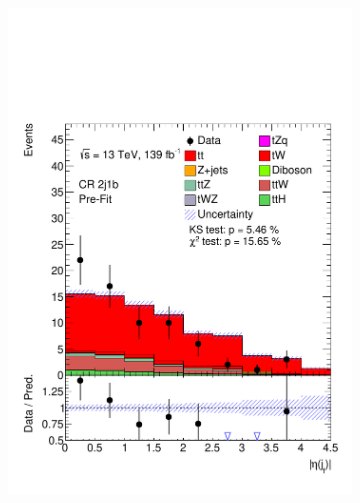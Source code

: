 \begin{figure}[h!]
\begin{subfigure}[b]{0.33\linewidth}
    \includegraphics[width=\linewidth]{ubonn-thesis/Chapters/Chapters_05/Figure/CR_tt/CR_2j1b_forwardjet_eta.pdf} 
  \end{subfigure} 
  \begin{subfigure}[b]{0.33\linewidth}
    \centering

\end{subfigure}
\end{figure}
